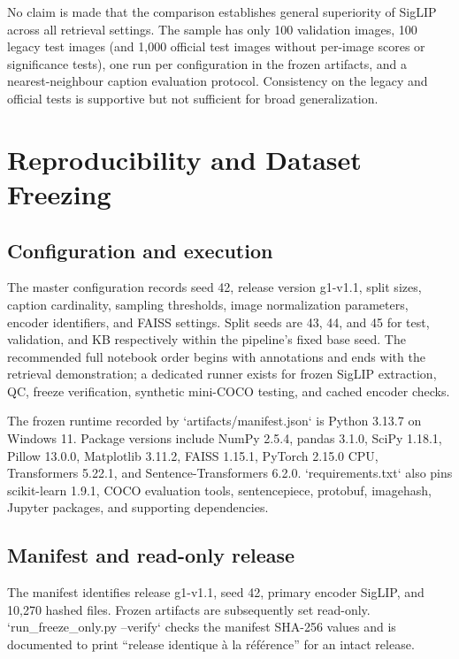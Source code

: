 \documentclass{article}
\begin{document}
No claim is made that the comparison establishes general superiority of
SigLIP across all retrieval settings. The sample has only 100 validation
images, 100 legacy test images (and 1,000 official test images without
per-image scores or significance tests), one run per configuration in the
frozen artifacts, and a nearest-neighbour caption evaluation protocol.
Consistency on the legacy and official tests is supportive but not sufficient
for broad generalization.

\section{Reproducibility and Dataset
Freezing}\label{reproducibility-and-dataset-freezing}

\subsection{Configuration and
execution}\label{configuration-and-execution}

The master configuration records seed 42, release version g1-v1.1, split
sizes, caption cardinality, sampling thresholds, image normalization
parameters, encoder identifiers, and FAISS settings. Split seeds are 43,
44, and 45 for test, validation, and KB respectively within the
pipeline's fixed base seed. The recommended full notebook order begins
with annotations and ends with the retrieval demonstration; a dedicated
runner exists for frozen SigLIP extraction, QC, freeze verification,
synthetic mini-COCO testing, and cached encoder checks.

The frozen runtime recorded by `artifacts/manifest.json` is Python
3.13.7 on Windows 11. Package versions include NumPy 2.5.4, pandas
3.1.0, SciPy 1.18.1, Pillow 13.0.0, Matplotlib 3.11.2, FAISS 1.15.1,
PyTorch 2.15.0 CPU, Transformers 5.22.1, and Sentence-Transformers
6.2.0. `requirements.txt` also pins scikit-learn 1.9.1, COCO evaluation
tools, sentencepiece, protobuf, imagehash, Jupyter packages, and
supporting dependencies.

\subsection{Manifest and read-only
release}\label{manifest-and-read-only-release}

The manifest identifies release g1-v1.1, seed 42, primary encoder
SigLIP, and 10,270 hashed files. Frozen artifacts are subsequently set
read-only. `run\_freeze\_only.py --verify` checks the manifest SHA-256
values and is documented to print ``release identique à la référence''
for an intact release.
\end{document}
